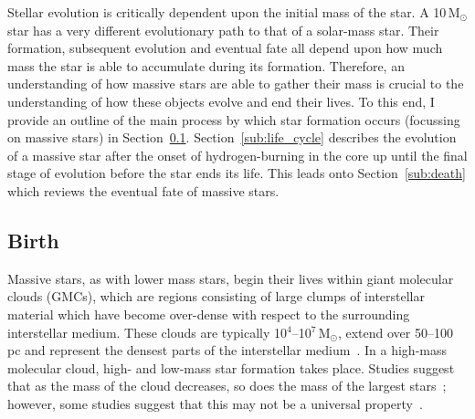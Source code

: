 Stellar evolution is critically dependent upon the initial mass of the star.
A 10\,M$_{\odot}$ star has a very different evolutionary path to that of a solar-mass star.
Their formation, subsequent evolution and eventual fate all depend upon how much mass the star is able to accumulate during its formation.
Therefore, an understanding of how massive stars are able to gather their mass is crucial to the understanding of how these objects evolve and end their lives.
To this end, I provide an outline of the main process by which star formation occurs (focussing on massive stars) in Section~\ref{sub:birth}. Section~\ref{sub:life_cycle} describes the evolution of a massive star after the onset of hydrogen-burning in the core up until the final stage of evolution before the star ends its life.
This leads onto Section~\ref{sub:death} which reviews the eventual fate of massive stars.

\subsection{Birth} %
\label{sub:birth}

Massive stars, as with lower mass stars, begin their lives within giant molecular clouds (GMCs), which are regions consisting of large clumps of interstellar material which have become over-dense with respect to the surrounding interstellar medium.
These clouds are typically 10$^{4}$--10$^{7}$\,M$_{\odot}$, extend over 50--100\,pc and represent the densest parts of the interstellar medium~\citep{Fukui10}.
In a high-mass molecular cloud, high- and low-mass star formation takes place.
Studies suggest that as the mass of the cloud decreases, so does the mass of the largest stars~\citep{Fukui10,Weidner10}; however, some studies suggest that this may not be a universal property~\citep[e.g.][]{Bressert12}.

